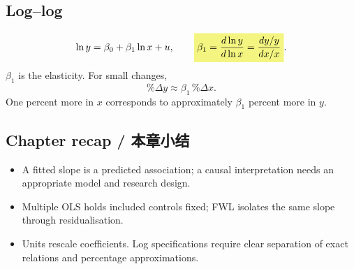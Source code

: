 \subsection{Log--log}
\[\ln y=\beta_0+\beta_1\ln x+u,\qquad
\hm{\beta_1=\frac{d\ln y}{d\ln x}
=\frac{dy/y}{dx/x}}.\]
$\beta_1$ is the elasticity. For small changes,
\[\%\Delta y\approx\beta_1\,\%\Delta x.\]
One percent more in $x$ corresponds to approximately $\beta_1$ percent more in $y$.

\subsection*{Chapter recap / 本章小结}
\begin{itemize}
\item A fitted slope is a predicted association; a causal interpretation needs an appropriate model and research design.
\item Multiple OLS holds included controls fixed; FWL isolates the same slope through residualisation.
\item Units rescale coefficients. Log specifications require clear separation of exact relations and percentage approximations.
\end{itemize}
